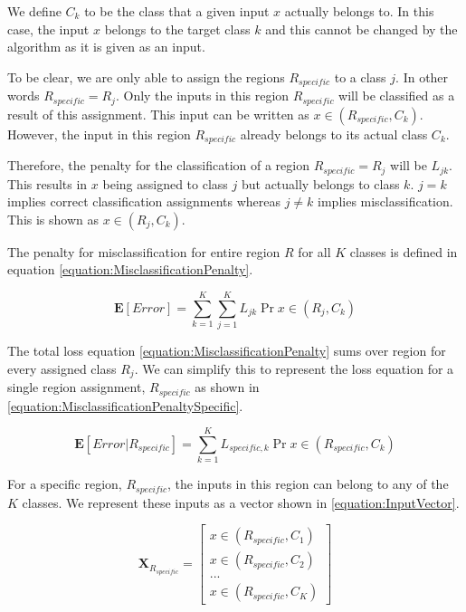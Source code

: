 \documentclass[a4paper,12pt]{article}
\begin{document}
We define $C_{k}$ to be the class that a given input $x$ actually belongs to. In this case, the input $x$ belongs to the target class $k$ and this cannot be changed by the algorithm as it is given as an input. 

To be clear, we are only able to assign the regions $R_{specific}$ to a class $j$. In other words $R_{specific} = R_{j}$. Only the inputs in this region $R_{specific}$ will be classified as a result of this assignment. This input can be written as $x \in (R_{specific}, C_{k})$. However, the input in this region $R_{specific}$ already belongs to its actual class $C_{k}$.

Therefore, the penalty for the classification of a region $R_{specific} = R_{j}$ will be $L_{jk}$. This results in $x$ being assigned to class $j$ but actually belongs to class $k$. $j=k$ implies correct classification assignments whereas $j \neq k$ implies misclassification. This is shown as $x \in (R_{j}, C_{k})$. 

The penalty for misclassification for entire region $R$ for all $K$ classes is defined in equation \ref{equation:MisclassificationPenalty}. 

\begin{equation}
\label{equation:MisclassificationPenalty}
\mathbf{E}[Error] = \sum_{k=1}^{K} \sum_{j=1}^{K} L_{jk} \Pr{x \in (R_{j}, C_{k})}
\end{equation}

The total loss equation \ref{equation:MisclassificationPenalty} sums over region for every assigned class $R_{j}$. We can simplify this to represent the loss equation for a single region assignment, $R_{specific}$ as shown in \ref{equation:MisclassificationPenaltySpecific}.

\begin{equation}
\label{equation:MisclassificationPenaltySpecific}
\mathbf{E}[Error | R_{specific}]  = \sum_{k=1}^{K} L_{specific,k} \Pr{x \in (R_{specific}, C_{k})}
\end{equation}

For a specific region, $R_{specific}$, the inputs in this region can belong to any of the $K$ classes. We represent these inputs as a vector shown in \ref{equation:InputVector}. 

\begin{equation}
\label{equation:InputVector}
\mathbf{X}_{R_{specific}} =
  \begin{bmatrix}
    x \in (R_{specific}, C_{1}) \\
    x \in (R_{specific}, C_{2})  \\
    ... \\
    x \in (R_{specific}, C_{K})  
  \end{bmatrix}
\end{equation}
\end{document}
